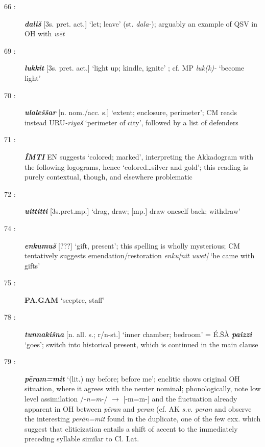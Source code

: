 \documentclass[10pt]{article}
\newcommand{\bit}[1]{\textbf{\textit{#1}}}				%
\newcommand{\p}[1]{{\tiny[{#1}]}}					%
\newcommand{\hith}{\textsubwedge{h}}
\renewcommand{\.}[1]{\textsubdot{#1}}
\begin{document}
\begin{description}
\item[66 :] \bit{dali\v{s}} \p{3s. pret. act.} `let; leave'  (st. \textit{dala-}); arguably an example of QSV  in OH with \textit{w\=et}

\item[69 :] \bit{lukkit} \p{3s. pret. act.} `light up; kindle, ignite' ; cf. MP \textit{luk(k)-} `become light'

\item[70 :] \bit{{\hith}ulale\v{s}\v{s}ar} \p{n. nom./acc. s.} `extent; enclosure, perimeter'; CM reads instead URU\textit{-riya\v{s}} `perimeter of city', followed by a list of defenders

\item[71 :] \bit{\'IMTI} EN suggests `colored; marked', interpreting the Akkadogram with the following logograms, hence `colored{\ldots}silver and gold'; this reading is purely contextual, though, and elsewhere problematic

\item[72 :] \bit{{\hith}uittitti} \p{3s.pret.mp.} `drag, draw; \p{mp.} draw oneself back; withdraw'

\item[74 :] \bit{{\hith}enkumu\v{s}} \p{???} `gift, present'; this spelling is wholly mysterious; CM tentatively suggests emendation/restoration \textit{{\hith}enku[nit uwet]} `he came with gifts'

\item[75 :] \textbf{PA.GAM} `sceptre, staff'

\item[78 :] \bit{tunnaki\v{s}na} \p{n. all. s.; r/n-st.} `inner chamber; bedroom' = \'E.\v{S}\`A \textbf{\textit{paizzi}} `goes'; switch into historical present, which is continued in the main clause

\item[79 :] \bit{p\=eram=mit} `(lit.) my before; before me'; enclitic shows original OH situation, where it agrees with the neuter nominal; phonologically, note low level assimilation /-\textit{n=m}-/ $\rightarrow$ [-m=m-] and the fluctuation already apparent in OH between \textit{p\=eran} and \textit{peran} (cf. AK \textit{s.v. peran} and observe the interesting \textit{per\=an=mit} found in the duplicate, one of the few exx. which suggest that cliticization entails a shift of accent to the immediately preceding syllable similar to Cl. Lat. \citep[cf.][106-107]{AHP}

\end{description}
\end{document}
